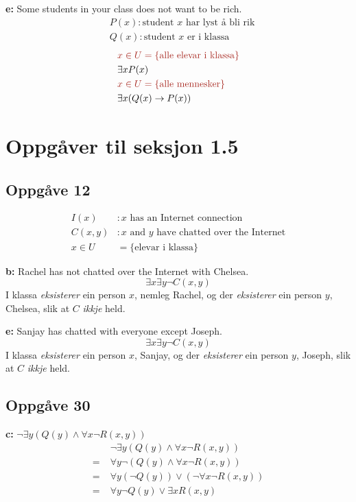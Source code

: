 \documentclass[a4paper, 11pt]{article}
\newcommand{\deloppg}[1]{\vspace{1mm}\noindent \textbf{\themecolor{#1:}}}
\newcommand{\themeshade}{Mahogany}
\newcommand{\themecolor}[1]{\textcolor{\themeshade}{#1}}
\begin{document}
\deloppg{e} Some students in your class does not want to be rich.
\begin{align*}
    &P(x): \text{student $x$ har lyst å bli rik}\\
    &Q(x): \text{student $x$ er i klassa}
\end{align*}
\begin{align*}
    &\themecolor{x\in U = \{\text{alle elevar i klassa}\}} \\
    &\exists x P(x) \\
    &\themecolor{x\in U = \{ \text{alle mennesker} \}} \\
    &\exists x (Q(x)\rightarrow P(x))
\end{align*}


\section*{Oppgåver til seksjon 1.5}
 
\subsection*{Oppgåve 12}
\begin{align*}
    I(x)&: \text{$x$ has an Internet connection} \\
    C(x,y)&: \text{$x$ and $y$ have chatted over the Internet}\\
    x \in U &= \{ \text{elevar i klassa} \}
\end{align*}

\deloppg{b} Rachel has not chatted over the Internet with Chelsea.
\[
    \exists x \exists y \neg C(x,y)
\]
I klassa {\em eksisterer} ein person $x$, nemleg Rachel,
og der {\em eksisterer} ein person $y$, Chelsea,
slik at $C$ {\em ikkje} held.


\deloppg{e} Sanjay has chatted with everyone except Joseph.
\[
    \exists x \exists y \neg C(x,y)
\]
I klassa {\em eksisterer} ein person $x$, Sanjay,
og der {\em eksisterer} ein person $y$, Joseph,
slik at $C$ {\em ikkje} held.

\subsection*{Oppgåve 30}
\deloppg{c} $\neg \exists y (Q(y) \land \forall x \neg R(x,y))$
\begin{align*}
     &\; \neg \exists y (Q(y) \land \forall x \neg R(x,y)) \\
    =&\; \forall y \neg (Q(y) \land \forall x \neg R(x,y)) \\
    =&\; \forall y (\neg Q(y)) \lor (\neg \forall x \neg R(x,y)) \\
    =&\; \forall y \neg Q(y) \lor \exists x R(x,y)
\end{align*}
\end{document}

